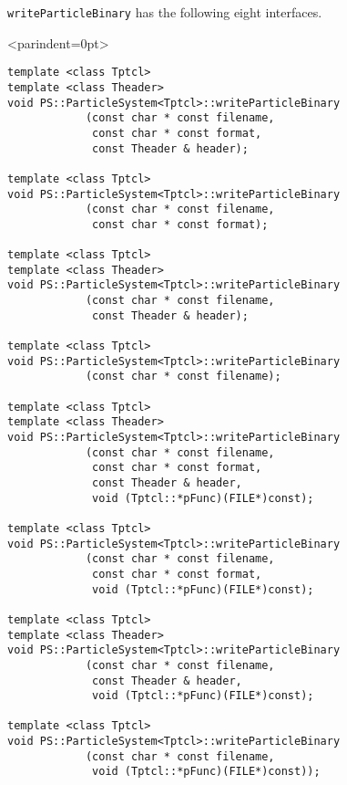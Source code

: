 \label{sec:writeParticleBinary}

\texttt{writeParticleBinary} has the following eight interfaces.
\begin{breakitembox}<parindent=0pt>{}
\begin{verbatim}
template <class Tptcl>
template <class Theader>
void PS::ParticleSystem<Tptcl>::writeParticleBinary
            (const char * const filename,
             const char * const format,
             const Theader & header);
             
template <class Tptcl>
void PS::ParticleSystem<Tptcl>::writeParticleBinary
            (const char * const filename,
             const char * const format);

template <class Tptcl>
template <class Theader>
void PS::ParticleSystem<Tptcl>::writeParticleBinary
            (const char * const filename,
             const Theader & header);

template <class Tptcl>
void PS::ParticleSystem<Tptcl>::writeParticleBinary
            (const char * const filename);

template <class Tptcl>
template <class Theader>
void PS::ParticleSystem<Tptcl>::writeParticleBinary
            (const char * const filename,
             const char * const format,
             const Theader & header,
             void (Tptcl::*pFunc)(FILE*)const);

template <class Tptcl>
void PS::ParticleSystem<Tptcl>::writeParticleBinary
            (const char * const filename,
             const char * const format,
             void (Tptcl::*pFunc)(FILE*)const);

template <class Tptcl>
template <class Theader>
void PS::ParticleSystem<Tptcl>::writeParticleBinary
            (const char * const filename,
             const Theader & header,
             void (Tptcl::*pFunc)(FILE*)const);

template <class Tptcl>             
void PS::ParticleSystem<Tptcl>::writeParticleBinary
            (const char * const filename,
             void (Tptcl::*pFunc)(FILE*)const));
\end{verbatim}
\end{breakitembox}

